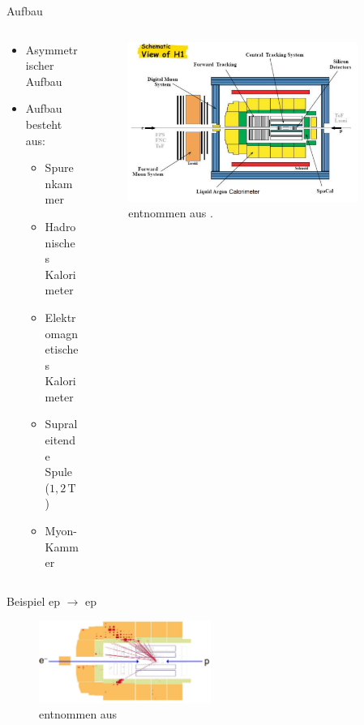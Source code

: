 \documentclass[aspectratio=1610, 9pt]{beamer}
\begin{document}
\begin{frame}{Aufbau}
  \begin{columns}
    \begin{column}{0.4\textwidth}
      \begin{itemize}
        \item{Asymmetrischer Aufbau}
        \item{Aufbau besteht aus:}
        \begin{itemize}
          \item{Spurenkammer}
          \item{Hadronisches Kalorimeter}
          \item{Elektromagnetisches Kalorimeter}
          \item{Supraleitende Spule ($1,2\,\mathrm{T} $)}
          \item{Myon-Kammer}
        \end{itemize}
      \end{itemize}
    \end{column}

    \begin{column}{0.6\textwidth}
      \begin{figure}
        \centering
        \includegraphics[width=0.9\textwidth]{images/H1.png}
        \caption{entnommen aus \cite{DESY-H1}.}
      \end{figure}
    \end{column}
  \end{columns}
\end{frame}

\begin{frame}{Beispiel}
  ep $\rightarrow$ ep
  \begin{figure}
    \centering
    \includegraphics[width=0.50\textwidth]{images/ep-ep.png}
    \caption{entnommen aus \cite{DESY-TALK} }
  \end{figure}
\end{frame}
\end{document}
